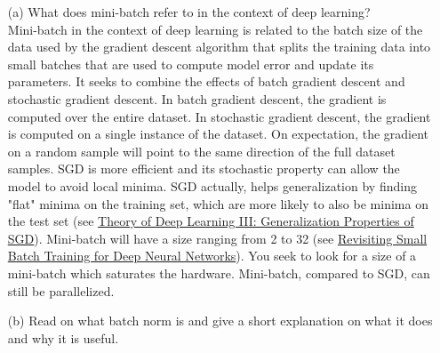 \documentclass[11pt]{article}
\newcommand{\0}{\mat{0}}
\begin{document}
\begin{itemize}
    \item[(a)]   What does mini-batch refer to in the context of deep learning?\\
    Mini-batch in the context of deep learning is related to the batch size of the data used by the gradient descent algorithm that splits the training
    data into small batches that are used to compute model error and update its parameters. It seeks to combine the effects of batch gradient descent and stochastic gradient descent.
    In batch gradient descent, the gradient is computed over the entire dataset. In stochastic gradient descent, the gradient is computed on a single instance of the dataset. On expectation, the gradient on a random sample will point to the same direction of the full dataset samples. SGD is more efficient and its stochastic property  can allow the model to avoid local minima.  SGD actually, helps generalization by finding "flat" minima on the training set, which are more likely to also be minima on the test set (see \href{https://cbmm.mit.edu/sites/default/files/publications/CBMM-Memo-067.pdf}{Theory of Deep Learning III: Generalization Properties of SGD}). Mini-batch will have a size ranging from 2 to 32 (see \href{https://arxiv.org/abs/1804.07612}{Revisiting Small Batch Training for Deep Neural Networks}). You seek to look for a size of a mini-batch which saturates the hardware. Mini-batch, compared to SGD, can still be parallelized. 
    \item[(b)] Read on what batch norm is and give a short explanation on what it does and why it is useful.

\end{itemize}
\end{document}

